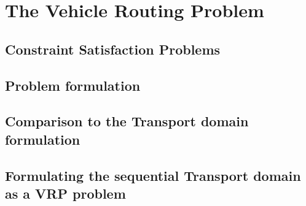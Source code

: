 \section{The Vehicle Routing Problem}

 \cite{Dantzig1959}

\subsection{Constraint Satisfaction Problems}

\subsection{Problem formulation}

\subsection{Comparison to the Transport domain formulation}

\subsection{Formulating the sequential Transport domain as a VRP problem}

